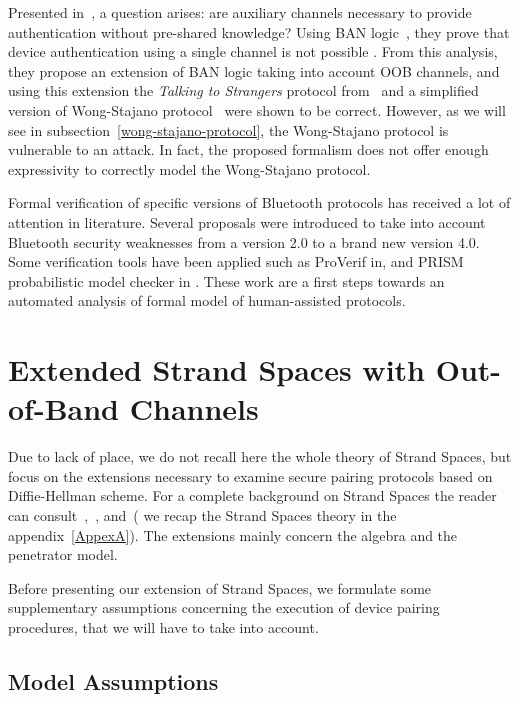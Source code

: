 Presented in~\cite{jisis11-1-1-07}, a question arises: are auxiliary channels necessary to provide authentication without pre-shared knowledge? Using BAN logic~\cite{Burrows90alogic}, they prove that device authentication using a single channel is not possible . From this analysis, they propose an extension of BAN logic taking into account OOB channels, and using this extension the \textit{Talking to Strangers} protocol from~\cite{Smetters02talkingto} and a simplified version of Wong-Stajano protocol~\cite{10.1109/MPRV.2007.76} were shown to be correct. However, as we will see in subsection~\ref{wong-stajano-protocol}, the Wong-Stajano protocol is vulnerable to an attack. In fact, the proposed formalism does not offer enough expressivity to correctly model the Wong-Stajano protocol.
 
Formal verification of specific versions of Bluetooth protocols has received a lot of attention in literature. Several proposals were introduced to take into account Bluetooth security weaknesses from a version 2.0 to a brand new version 4.0. Some verification tools have been applied such as ProVerif in\cite{Chang_formalanalysis}, and PRISM probabilistic model checker in \cite{Duflot:2006rm}. These work are a first steps towards an automated analysis of formal model of human-assisted protocols. 

\section{Extended Strand Spaces with Out-of-Band Channels}\label{extended-strand}

Due to lack of place, we do not recall here the whole theory of Strand Spaces, but focus on the extensions necessary to examine secure pairing protocols based on Diffie-Hellman scheme. For a complete background on Strand Spaces the reader can consult~\cite{674832},~\cite{Guttman:2002:ATS:568264.568267}, and~\cite{1212716}( we recap the Strand Spaces theory in the appendix~\ref{AppexA}). The extensions mainly concern the algebra and the penetrator model.

Before presenting our extension of Strand Spaces, we formulate some supplementary assumptions concerning the execution of device pairing procedures, that we will have to take into account.
 
\subsection{Model Assumptions}

